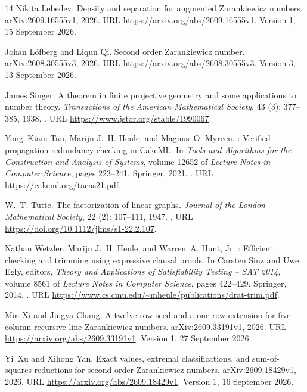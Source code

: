 \documentclass[11pt,a4paper]{article}
\theoremstyle{definition}
\begin{document}
\begin{thebibliography}{14}
Nikita Lebedev.
\newblock Density and separation for augmented {Zarankiewicz} numbers.
\newblock arXiv:2609.16555v1, 2026.
\newblock URL \url{https://arxiv.org/abs/2609.16555v1}.
\newblock Version 1, 15 September 2026.

Johan L{\"o}fberg and Liqun Qi.
\newblock Second order {Zarankiewicz} number.
\newblock arXiv:2608.30555v3, 2026.
\newblock URL \url{https://arxiv.org/abs/2608.30555v3}.
\newblock Version 3, 13 September 2026.

James Singer.
\newblock A theorem in finite projective geometry and some applications to
  number theory.
\newblock \emph{Transactions of the American Mathematical Society}, 43
  (3): 377--385, 1938.
\newblock {}.
\newblock URL \url{https://www.jstor.org/stable/1990067}.

Yong~Kiam Tan, Marijn J.~H. Heule, and Magnus~O. Myreen.
: Verified propagation redundancy checking in {CakeML}.
\newblock In \emph{Tools and Algorithms for the Construction and Analysis of
  Systems}, volume 12652 of \emph{Lecture Notes in Computer Science}, pages
  223--241. Springer, 2021.
\newblock {}.
\newblock URL \url{https://cakeml.org/tacas21.pdf}.

W.~T. Tutte.
\newblock The factorization of linear graphs.
\newblock \emph{Journal of the London Mathematical Society}, 22
  (2): 107--111, 1947.
\newblock {}.
\newblock URL \url{https://doi.org/10.1112/jlms/s1-22.2.107}.

Nathan Wetzler, Marijn J.~H. Heule, and Warren~A. Hunt, Jr.
: Efficient checking and trimming using expressive clausal
  proofs.
\newblock In Carsten Sinz and Uwe Egly, editors, \emph{Theory and Applications
  of Satisfiability Testing -- SAT 2014}, volume 8561 of \emph{Lecture Notes in
  Computer Science}, pages 422--429. Springer, 2014.
\newblock {}.
\newblock URL \url{https://www.cs.cmu.edu/~mheule/publications/drat-trim.pdf}.

Min Xi and Jingya Chang.
\newblock A twelve-row seed and a one-row extension for five-column
  recursive-line {Zarankiewicz} numbers.
\newblock arXiv:2609.33191v1, 2026.
\newblock URL \url{https://arxiv.org/abs/2609.33191v1}.
\newblock Version 1, 27 September 2026.

Yi~Xu and Xihong Yan.
\newblock Exact values, extremal classifications, and sum-of-squares reductions
  for second-order {Zarankiewicz} numbers.
\newblock arXiv:2609.18429v1, 2026.
\newblock URL \url{https://arxiv.org/abs/2609.18429v1}.
\newblock Version 1, 16 September 2026.

\end{thebibliography}
\endgroup
\end{document}
